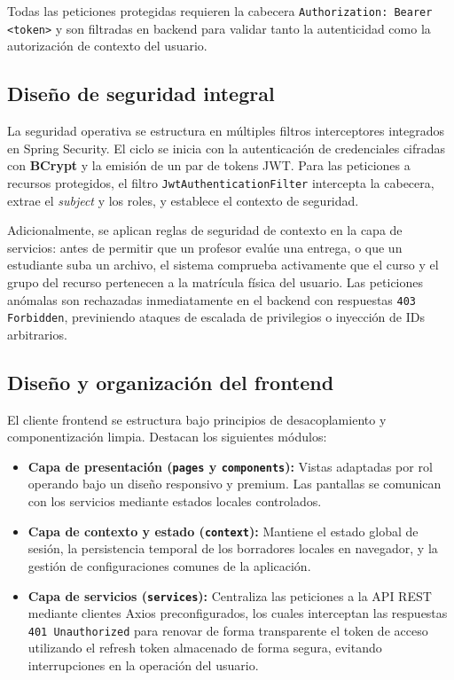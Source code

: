 Todas las peticiones protegidas requieren la cabecera \texttt{Authorization: Bearer <token>} y son filtradas en backend para validar tanto la autenticidad como la autorizaci\'on de contexto del usuario.

\subsection{Dise\~no de seguridad integral}

La seguridad operativa se estructura en m\'ultiples filtros interceptores integrados en Spring Security. El ciclo se inicia con la autenticaci\'on de credenciales cifradas con \textbf{BCrypt} y la emisi\'on de un par de tokens JWT. Para las peticiones a recursos protegidos, el filtro \texttt{JwtAuthenticationFilter} intercepta la cabecera, extrae el \emph{subject} y los roles, y establece el contexto de seguridad.

Adicionalmente, se aplican reglas de seguridad de contexto en la capa de servicios: antes de permitir que un profesor eval\'ue una entrega, o que un estudiante suba un archivo, el sistema comprueba activamente que el curso y el grupo del recurso pertenecen a la matr\'icula f\'isica del usuario. Las peticiones an\'omalas son rechazadas inmediatamente en el backend con respuestas \texttt{403 Forbidden}, previniendo ataques de escalada de privilegios o inyecci\'on de IDs arbitrarios.

\subsection{Dise\~no y organizaci\'on del frontend}

El cliente frontend se estructura bajo principios de desacoplamiento y componentizaci\'on limpia. Destacan los siguientes m\'odulos:
\begin{itemize}
    \item \textbf{Capa de presentaci\'on (\texttt{pages} y \texttt{components}):} Vistas adaptadas por rol operando bajo un dise\~no responsivo y premium. Las pantallas se comunican con los servicios mediante estados locales controlados.
    \item \textbf{Capa de contexto y estado (\texttt{context}):} Mantiene el estado global de sesi\'on, la persistencia temporal de los borradores locales en navegador, y la gesti\'on de configuraciones comunes de la aplicaci\'on.
    \item \textbf{Capa de servicios (\texttt{services}):} Centraliza las peticiones a la API REST mediante clientes Axios preconfigurados, los cuales interceptan las respuestas \texttt{401 Unauthorized} para renovar de forma transparente el token de acceso utilizando el refresh token almacenado de forma segura, evitando interrupciones en la operaci\'on del usuario.
\end{itemize}

